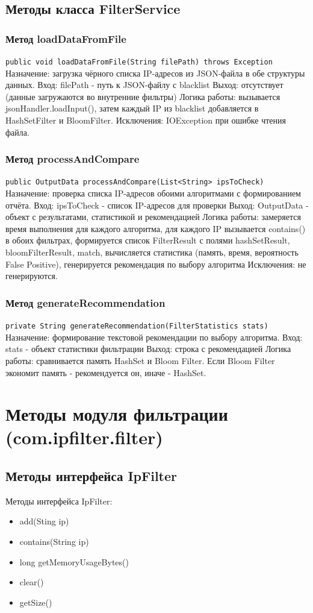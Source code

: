 \subsection{Методы класса FilterService}
\subsubsection{Метод loadDataFromFile}
\texttt{public void loadDataFromFile(String filePath) throws Exception}
Назначение: загрузка чёрного списка IP-адресов из JSON-файла в обе структуры данных.
Вход: filePath - путь к JSON-файлу с blacklist
Выход: отсутствует (данные загружаются во внутренние фильтры)
Логика работы: вызывается jsonHandler.loadInput(), затем каждый IP из blacklist добавляется в HashSetFilter и BloomFilter.
Исключения: IOException при ошибке чтения файла.

\subsubsection{Метод processAndCompare}
\texttt{public OutputData processAndCompare(List<String> ipsToCheck)}
Назначение: проверка списка IP-адресов обоими алгоритмами с формированием отчёта.
Вход: ipsToCheck - список IP-адресов для проверки
Выход: OutputData - объект с результатами, статистикой и рекомендацией
Логика работы: замеряется время выполнения для каждого алгоритма, для каждого IP вызывается contains() в обоих фильтрах, формируется список FilterResult с полями hashSetResult, bloomFilterResult, match, вычисляется статистика (память, время, вероятность False Positive), генерируется рекомендация по выбору алгоритма
Исключения: не генерируются.

\subsubsection{Метод generateRecommendation}
\texttt{private String generateRecommendation(FilterStatistics stats)}
Назначение: формирование текстовой рекомендации по выбору алгоритма.
Вход: stats - объект статистики фильтрации
Выход: строка с рекомендацией
Логика работы: сравнивается память HashSet и Bloom Filter. Если Bloom Filter экономит память - рекомендуется он, иначе - HashSet.


\section{Методы модуля фильтрации (com.ipfilter.filter)}
\subsection{Методы интерфейса IpFilter}
Методы интерфейса IpFilter:
\begin{itemize}
    \item add(Sting ip)
    \item contains(String ip)
    \item long getMemoryUsageBytes()
    \item clear()
    \item getSize()
\end{itemize}

